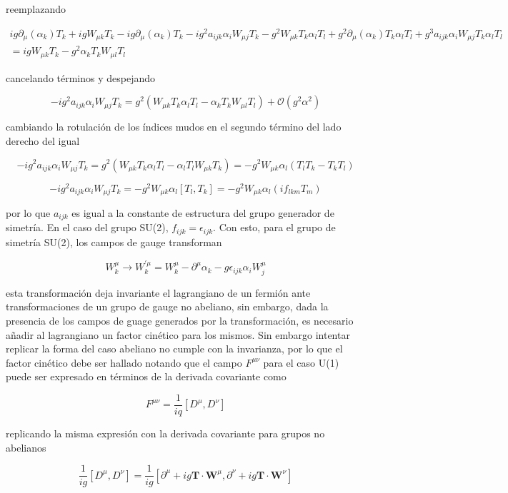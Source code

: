 reemplazando

\begin{multline}
   ig\partial_{\mu}(\alpha_k)T_k + igW_{\mu k}T_k - ig\partial_{\mu}(\alpha_k)T_k - ig^2a_{ijk}\alpha_iW_{\mu j}T_k - g^2W_{\mu k }T_k\alpha_lT_l + g^2\partial_{\mu}(\alpha_k)T_k\alpha_lT_l + g^3a_{ijk}\alpha_i W_{\mu j}T_k\alpha_lT_l \\
   = igW_{\mu k}T_k - g^2 \alpha_kT_kW_{\mu l}T_l 
\end{multline}

cancelando términos y despejando

$$ - ig^2a_{ijk}\alpha_iW_{\mu j}T_k = g^2(W_{\mu k }T_k\alpha_lT_l -\alpha_kT_kW_{\mu l}T_l) + \mathcal{O}(g^2\alpha^2) $$

cambiando la rotulación de los índices mudos en el segundo término del lado derecho del igual 

$$ - ig^2a_{ijk}\alpha_iW_{\mu j}T_k = g^2(W_{\mu k }T_k\alpha_lT_l -\alpha_lT_lW_{\mu k}T_k) = -g^2 W_{\mu k }\alpha_l (T_lT_k - T_kT_l)$$

$$ - ig^2a_{ijk}\alpha_iW_{\mu j}T_k = -g^2 W_{\mu k }\alpha_l[T_l, T_k] = -g^2 W_{\mu k }\alpha_l(if_{lkm}T_m) $$

por lo que $a_{ijk}$ es igual a la constante de estructura del grupo generador de simetría. En el caso del grupo SU(2), $f_{ijk}=\epsilon_{ijk}$. Con esto, para el grupo de simetría SU(2), los campos de gauge transforman

\begin{equation}
    W_k^{\mu} \longrightarrow W_k^{'\mu} = W_k^{\mu} -\partial^{\mu} \alpha_k -g \epsilon_{ijk}\alpha_i W_j^{\mu} 
    \label{trnab}
\end{equation}

esta transformación deja invariante el lagrangiano de un fermión ante transformaciones de un grupo de gauge no abeliano, sin embargo, dada la presencia de los campos de guage generados por la transformación, es necesario añadir al lagrangiano un factor cinético para los mismos. Sin embargo intentar replicar la forma del caso abeliano no cumple con la invarianza, por lo que el factor cinético debe ser hallado notando que el campo $F^{\mu\nu}$ para el caso U(1) puede ser expresado en términos de la derivada covariante como

$$ F^{\mu\nu} = \frac{1}{iq}[D^{\mu}, D^{\nu}] $$

replicando la misma expresión con la derivada covariante para grupos no abelianos

$$ \frac{1}{ig}[D^{\mu}, D^{\nu}] = \frac{1}{ig}[\partial^{\mu} + ig\textbf{T}\cdot \textbf{W}^{\mu}, \partial^{\nu} + ig\textbf{T}\cdot \textbf{W}^{\nu}] $$

